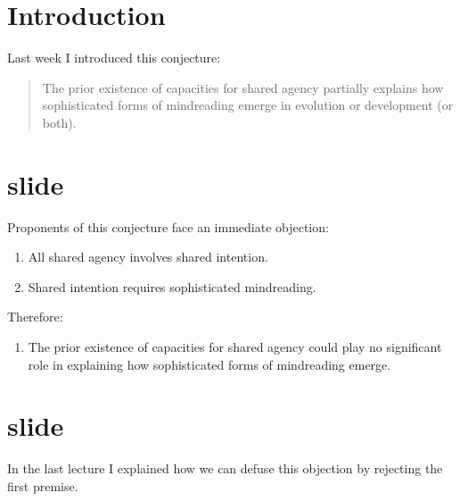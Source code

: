 \documentclass[12pt,\papersize]{extarticle}
\begin{document}
\setlength\footnotesep{1em}




\maketitle
%
%
%


\section{Introduction}
Last week I introduced this conjecture:
\begin{quote}
The prior existence of capacities for shared agency partially explains how sophisticated forms of mindreading emerge in evolution or development (or both).
\end{quote}


\section{slide}
Proponents of this conjecture face an immediate objection:
\begin{enumerate}
\item 
	All shared agency involves shared intention.
\item 
	Shared intention requires sophisticated mindreading.
\end{enumerate}
%
Therefore:
%
\begin{enumerate}[resume]
\item 
	The prior existence of capacities for shared agency could play no significant role in explaining how sophisticated forms of mindreading emerge.
\end{enumerate}
%

\section{slide}
In the last lecture I explained how we can defuse this objection by rejecting the first premise.
\end{document}
